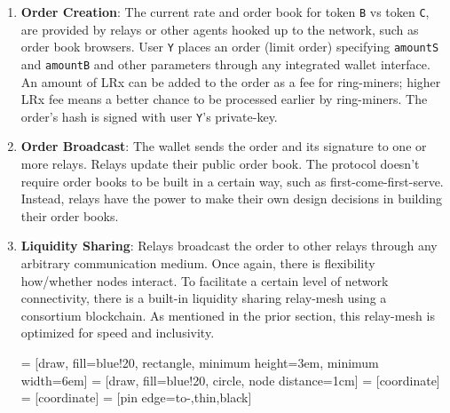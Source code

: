 \documentclass[UTF8,nofonts]{article}
\makeatletter
\newenvironment{figurehere}
 {\def\@captype{figure}}
 {}
\makeatother
\begin{document}
\begin{multicols}{2}
\begin{enumerate}
\item \textbf{Order Creation}: The current rate and order book for token \verb|B| vs token \verb|C|, are provided by relays or other agents hooked up to the network, such as order book browsers. User \verb|Y| places an order (limit order) specifying \verb|amountS| and \verb|amountB| and other parameters through any integrated wallet interface. An amount of LRx can be added to the order as a fee for ring-miners; higher LRx fee means a better chance to be processed earlier by ring-miners. The order's hash is signed with user \verb|Y|'s private-key.

\item \textbf{Order Broadcast}: The wallet sends the order and its signature to one or more relays. Relays update their public order book. The protocol doesn't require order books to be built in a certain way, such as first-come-first-serve. Instead, relays have the power to make their own design decisions in building their order books.

\item \textbf{Liquidity Sharing}: Relays broadcast the order to other relays through any arbitrary communication medium. Once again, there is flexibility how/whether nodes interact. To facilitate a certain level of network connectivity, there is a built-in liquidity sharing relay-mesh using a consortium blockchain. As mentioned in the prior section, this relay-mesh is optimized for speed and inclusivity.

\begin{center}
\begin{figurehere}
\centering
{} = [draw, fill=blue!20, rectangle, 
    minimum height=3em, minimum width=6em]
 = [draw, fill=blue!20, circle, node distance=1cm]
 = [coordinate]
 = [coordinate]
 = [pin edge={to-,thin,black}]

\begin{tikzpicture}[
    auto, 
    scale=0.7,
    node distance=2cm,
    >=latex',
    font=\bfseries\footnotesize\sffamily,
    order/.style={
		rectangle,
		scale=0.7,
		rounded corners,
		draw=black, 
		text centered,
		minimum height=12mm,
		minimum width=30mm,
		fill=white
	},
	role/.style={
		circle,
		scale=0.7,
		draw=black, 
		text centered,
		minimum height=12mm,
		minimum width=12mm,
		fill=white
	},
	steps/.style={
		circle,
		scale=0.7,
		draw=black, 
		text centered,
		fill=black,
		text=white
	},
	account/.style={
		circle,
		scale=0.7,
		draw=black, 
		text centered,
		minimum height=16mm,
		minimum width=16mm,
		fill=white
	},
	label/.style={
	  scale=0.7
    }
  ]


\end{tikzpicture}
\end{figurehere}
\end{center}
\end{enumerate}
\end{multicols}
\end{document}
